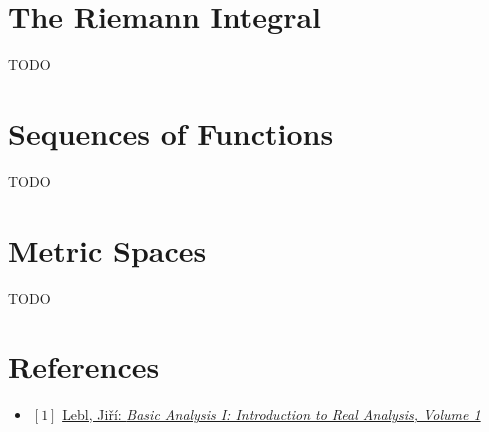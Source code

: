 \documentclass[12pt, letterpaper, oneside]{book}
\begin{document}
\chapter{The Riemann Integral}

TODO

%
%

\chapter{Sequences of Functions}

TODO

%
%

\chapter{Metric Spaces}

TODO

%
%

\chapter*{References}

\begin{itemize}
  \item $[1]$ \href{https://ocw.mit.edu/courses/18-100a-real-analysis-fall-2020/resources/mit18_100af20_basic_analysis/}{Lebl, Jiří: \it{Basic Analysis I: Introduction to Real Analysis, Volume 1}}
\end{itemize}
\end{document}
